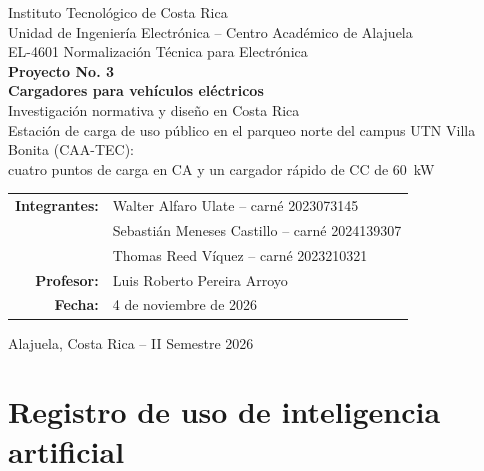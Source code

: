 \documentclass[12pt]{article}
\begin{document}
\begin{titlepage}
\centering
\vspace*{1.2cm}
{\Large Instituto Tecnológico de Costa Rica\\[0.3cm]}
{\large Unidad de Ingeniería Electrónica -- Centro Académico de Alajuela\\[1.0cm]}
{\large EL-4601 Normalización Técnica para Electrónica\\[0.5cm]}
{\LARGE\bfseries Proyecto No. 3\\[0.35cm]}
{\LARGE\bfseries Cargadores para vehículos eléctricos\\[0.2cm]}
{\Large Investigación normativa y diseño en Costa Rica\\[0.4cm]}
{\large Estación de carga de uso público en el parqueo norte del campus UTN Villa Bonita (CAA-TEC):\\ cuatro puntos de carga en CA y un cargador rápido de CC de \SI{60}{\kilo\watt}\\[1.5cm]}

\begin{tabular}{rl}
\textbf{Integrantes:} & Walter Alfaro Ulate -- carné 2023073145\\
& Sebastián Meneses Castillo -- carné 2024139307\\
& Thomas Reed Víquez -- carné 2023210321\\
\textbf{Profesor:} & Luis Roberto Pereira Arroyo\\
\textbf{Fecha:} & 4 de noviembre de 2026\\
\end{tabular}

\vfill
{\small Alajuela, Costa Rica -- II Semestre 2026}
\end{titlepage}

\tableofcontents
\clearpage
\listoffigures
\listoftables
\clearpage








\appendix

\section{Registro de uso de inteligencia artificial}
\label{sec:ia}

\end{document}
